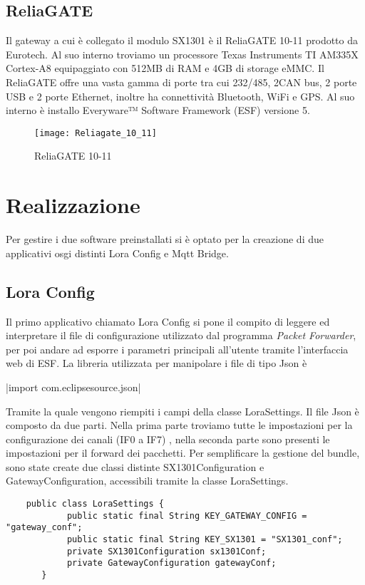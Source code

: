 \subsection{ReliaGATE}
Il gateway a cui è collegato il modulo SX1301 è il ReliaGATE 10-11 prodotto da
Eurotech. Al suo interno troviamo un processore Texas Instruments TI AM335X Cortex-A8 
equipaggiato con 512MB di RAM e 4GB di storage eMMC. Il ReliaGATE offre una
vasta gamma di porte tra cui 232/485, 2CAN bus, 2 porte USB e 2 porte Ethernet,
inoltre ha connettività Bluetooth, WiFi e GPS. Al suo interno è installo
Everyware™ Software Framework (ESF) versione 5.
\begin{figure}[th]
        \centering 
                \texttt{[image: Reliagate\_10\_11]}
        \caption{ReliaGATE 10-11}
        \label{fig:ReliaGATE}
\end{figure}



\section{Realizzazione}

Per gestire i due software preinstallati si è optato per la creazione di due
applicativi osgi distinti Lora Config e Mqtt Bridge.
\subsection{Lora Config}
Il primo applicativo chiamato Lora Config si pone il compito di leggere ed
interpretare il file di configurazione utilizzato dal programma \emph{Packet
Forwarder}, per poi andare ad esporre i parametri principali all'utente tramite
l'interfaccia web di ESF.
La libreria utilizzata per manipolare i file di tipo Json è 

|import com.eclipsesource.json|

Tramite la quale vengono riempiti i campi della classe LoraSettings. Il file
Json è composto da due parti. Nella prima parte
troviamo tutte le impostazioni per la configurazione dei canali (IF0 a IF7)
, nella seconda
parte sono presenti le impostazioni per il forward dei pacchetti. 
Per semplificare la gestione del bundle, sono state create due classi distinte
SX1301Configuration e GatewayConfiguration, accessibili tramite la classe LoraSettings.

\begin{verbatim}
    public class LoraSettings {
            public static final String KEY_GATEWAY_CONFIG = "gateway_conf";
            public static final String KEY_SX1301 = "SX1301_conf";
            private SX1301Configuration sx1301Conf;
            private GatewayConfiguration gatewayConf;
       } 
\end{verbatim}

